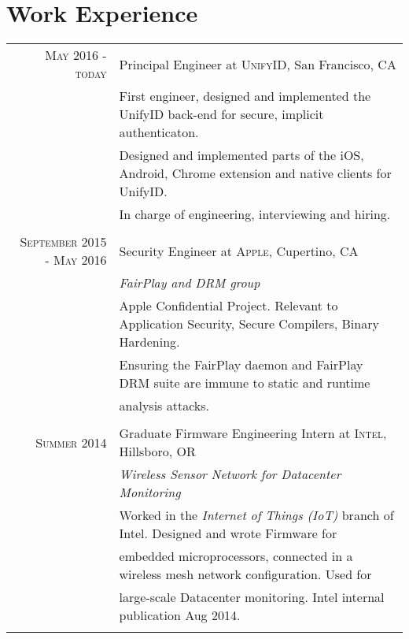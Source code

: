 \documentclass[lettersize,10pt]{article}
\begin{document}
\section{Work Experience}
\begin{tabular}{rl}
\textsc{ May 2016 - today} & Principal Engineer at \textsc{UnifyID}, San Francisco, CA\\
&\footnotesize{First engineer, designed and implemented the UnifyID back-end for secure, implicit authenticaton. }\\
&\footnotesize{Designed and implemented parts of the iOS, Android, Chrome extension and native clients for UnifyID.}\\
&\footnotesize{In charge of engineering, interviewing and hiring.}\\\multicolumn{2}{c}{} \\

\textsc{September 2015 - May 2016} & Security Engineer at \textsc{Apple}, Cupertino, CA \\&\emph{FairPlay and DRM group}\\
&\footnotesize{Apple Confidential Project. Relevant to Application Security, Secure Compilers, Binary Hardening.} \\
&\footnotesize{Ensuring the FairPlay daemon and FairPlay DRM suite are immune to static and runtime }\\
&\footnotesize{analysis attacks.}\\\multicolumn{2}{c}{} \\

\textsc{Summer 2014} & Graduate Firmware Engineering Intern at \textsc{Intel}, Hillsboro, OR \\&\emph{Wireless Sensor Network for Datacenter Monitoring}\\
&\footnotesize{Worked in the \textit{Internet of Things (IoT)} branch of Intel. Designed and wrote Firmware for} \\
&\footnotesize{embedded microprocessors, connected in a wireless mesh network configuration. Used for} \\
&\footnotesize{large-scale Datacenter monitoring. Intel internal publication Aug 2014.}\\\multicolumn{2}{c}{} \\
\end{tabular}

\end{document}
